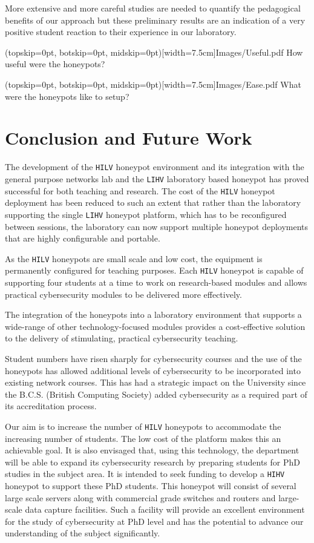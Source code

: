 \documentclass{ieeeaccess}
\begin{document}
More extensive and more careful studies are needed to quantify the 
pedagogical benefits of our approach but these preliminary results are an 
indication of a very positive student reaction to their experience in our
laboratory.

\Figure[t!](topskip=0pt, botskip=0pt, midskip=0pt)[width=7.5cm]{Images/Useful.pdf}
{How useful were the honeypots?\label{fig:Useful}}

\Figure[t!](topskip=0pt, botskip=0pt, midskip=0pt)[width=7.5cm]{Images/Ease.pdf}
{What were the honeypots like to setup?\label{fig:Ease}}

\section{Conclusion and Future Work}\label{sec:ConclusionFuture}

The development of the \texttt{HILV} honeypot environment and its integration
with the general purpose networks lab and the \texttt{LIHV} laboratory based
honeypot has proved successful for both teaching and research. The cost of the
\texttt{HILV} honeypot deployment has been reduced to such an extent that
rather than the laboratory supporting the single \texttt{LIHV} honeypot
platform, which has to be reconfigured between sessions, the laboratory can now
support multiple honeypot deployments that are highly configurable and
portable.

As the \texttt{HILV} honeypots are small scale and low cost, the equipment is
permanently configured for teaching purposes. Each \texttt{HILV} honeypot is
capable of supporting four students at a time to work on research-based modules
and allows practical cybersecurity modules to be delivered more effectively.

The integration of the honeypots into a laboratory environment that supports
a wide-range of other technology-focused modules provides a cost-effective
solution to the delivery of stimulating, practical cybersecurity teaching.

Student numbers have risen sharply for cybersecurity courses and the
use of the honeypots has allowed additional levels of cybersecurity to be
incorporated into existing network courses. This has had a strategic impact on
the University since the B.C.S. (British Computing Society) added
cybersecurity as a required part of its accreditation process.

Our aim is to increase the number of \texttt{HILV} honeypots to accommodate the
increasing number of students. The low cost of the platform makes this an
achievable goal. It is also envisaged that, using this technology, the
department will be able to expand its cybersecurity research by preparing
students for PhD studies in the subject area. It is intended to seek funding to
develop a \texttt{HIHV} honeypot to support these PhD students. This honeypot
will consist of several large scale servers along with commercial grade
switches and routers and large-scale data capture facilities. Such a facility
will provide an excellent environment for the study of cybersecurity at PhD
level and has the potential to advance our understanding of the subject
significantly.
\end{document}

